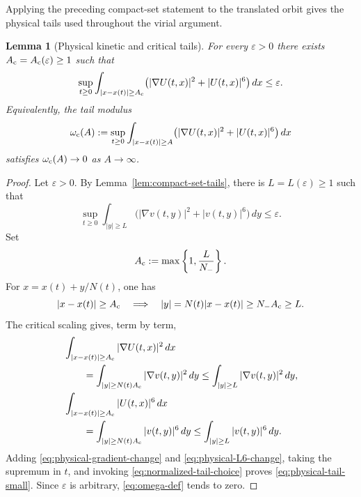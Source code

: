 \documentclass[preprint,12pt]{elsarticle}
\numberwithin{equation}{section}
\newtheorem{lemma}[theorem]{Lemma}
\theoremstyle{remark}
\newcommand{\eps}{\varepsilon}
\newcommand{\dd}{\,d}
\begin{document}
Applying the preceding compact-set statement to the translated orbit gives the physical tails used throughout the virial argument.

\begin{lemma}[Physical kinetic and critical tails]\label{lem:physical-tails}
For every $\eps>0$ there exists $A_{\rm c}=A_{\rm c}(\eps)\ge1$ such that
\begin{equation}\label{eq:physical-tail-small}
  \sup_{t\ge0}
  \int_{|x-x(t)|\ge A_{\rm c}}
  \bigl(|\nabla U(t,x)|^2+|U(t,x)|^6\bigr)\dd x
  \le\eps.
\end{equation}
Equivalently, the tail modulus
\begin{equation}\label{eq:omega-def}
  \omega_{\rm c}(A)
  :=\sup_{t\ge0}
  \int_{|x-x(t)|\ge A}
  \bigl(|\nabla U(t,x)|^2+|U(t,x)|^6\bigr)\dd x
\end{equation}
satisfies $\omega_{\rm c}(A)\to0$ as $A\to\infty$.
\end{lemma}

\begin{proof}
Let $\varepsilon>0$.  By Lemma~\ref{lem:compact-set-tails}, there is $L=L(\varepsilon)\ge1$ such that
\begin{equation}\label{eq:normalized-tail-choice}
  \sup_{t\ge0}
  \int_{|y|\ge L}
  \bigl(|\nabla v(t,y)|^2+|v(t,y)|^6\bigr)\dd y
  \le\varepsilon.
\end{equation}
Set
\begin{equation*}
  A_{\rm c}:=\max\left\{1,\frac{L}{N_-}\right\}.
\end{equation*}
For $x=x(t)+y/N(t)$, one has
\begin{equation*}
  |x-x(t)|\ge A_{\rm c}
  \quad\Longrightarrow\quad
  |y|=N(t)|x-x(t)|\ge N_-A_{\rm c}\ge L.
\end{equation*}
The critical scaling gives, term by term,
\begin{align}
 &\int_{|x-x(t)|\ge A_{\rm c}}|\nabla U(t,x)|^2\dd x\notag\\
 &\qquad=
  \int_{|y|\ge N(t)A_{\rm c}}|\nabla v(t,y)|^2\dd y
  \le\int_{|y|\ge L}|\nabla v(t,y)|^2\dd y,
  \label{eq:physical-gradient-change}\\
 &\int_{|x-x(t)|\ge A_{\rm c}}|U(t,x)|^6\dd x\notag\\
 &\qquad=
  \int_{|y|\ge N(t)A_{\rm c}}|v(t,y)|^6\dd y
  \le\int_{|y|\ge L}|v(t,y)|^6\dd y.
  \label{eq:physical-L6-change}
\end{align}
Adding \eqref{eq:physical-gradient-change} and \eqref{eq:physical-L6-change}, taking the supremum in $t$, and invoking \eqref{eq:normalized-tail-choice} proves \eqref{eq:physical-tail-small}.  Since $\varepsilon$ is arbitrary, \eqref{eq:omega-def} tends to zero.
\end{proof}
\end{document}
